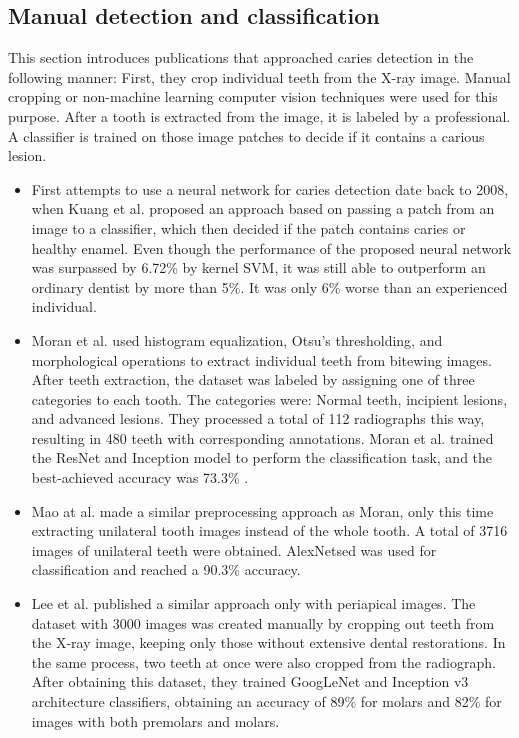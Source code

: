 \subsection{Manual detection and classification}
This section introduces publications that approached caries detection in the following manner: First, they crop individual teeth from the X-ray image. Manual cropping or non-machine learning computer vision techniques were used for this purpose. After a tooth is extracted from the image, it is labeled by a professional. A classifier is trained on those image patches to decide if it contains a carious lesion.
\begin{itemize}
    \item First attempts to use a neural network for caries detection date back to 2008, when Kuang et al. \cite{Kuang2008} proposed an approach based on passing a patch from an image to a classifier, which then decided if the patch contains caries or healthy enamel. Even though the performance of the proposed neural network was surpassed by 6.72\% by kernel SVM, it was still able to outperform an ordinary dentist by more than 5\%. It was only 6\% worse than an experienced individual.
    \item Moran et al.\cite{Moran2021} used histogram equalization, Otsu's thresholding, and morphological operations to extract individual teeth from bitewing images. After teeth extraction, the dataset was labeled by assigning one of three categories to each tooth. The categories were: Normal teeth, incipient lesions, and advanced lesions. They processed a total of 112 radiographs this way, resulting in 480 teeth with corresponding annotations. Moran et al. trained the ResNet and Inception model to perform the classification task, and the best-achieved accuracy was 73.3\% \cite{Moran2021}.
    \item{Mao at al. \cite{Mao2021}} made a similar preprocessing approach as Moran, only this time extracting unilateral tooth images instead of the whole tooth. A total of 3716 images of unilateral teeth were obtained. AlexNetsed was used for classification and reached a 90.3\% accuracy.
    \item{Lee et al. \cite{Lee2018}} published a similar approach only with periapical images. The dataset with 3000 images was created manually by cropping out teeth from the X-ray image, keeping only those without extensive dental restorations. In the same process, two teeth at once were also cropped from the radiograph. After obtaining this dataset, they trained GoogLeNet and Inception v3 architecture classifiers, obtaining an accuracy of 89\%  for molars and 82\% for images with both premolars and molars.
\end{itemize}


